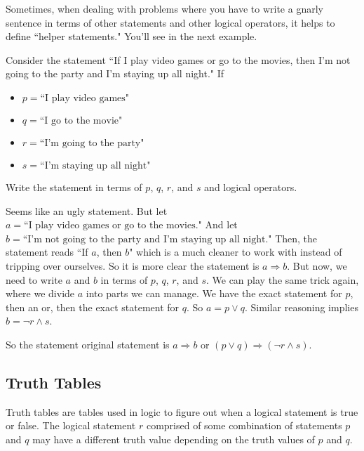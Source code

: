 \documentclass[11pt]{scrartcl}
\begin{document}
\begin{advice}
    Sometimes, when dealing with problems where you have to write a gnarly sentence in terms of other statements and other logical operators, it helps to define ``helper statements." You'll see in the next example.
\end{advice}

\begin{example}
    Consider the statement ``If I play video games or go to the movies, then I'm not going to the party and I'm  staying up all night." If
    \begin{itemize}
        \item $p = \text{``I play video games"}$
        \item $q = \text{``I go to the movie"}$
        \item $r = \text{``I'm going to the party"}$
        \item $s = \text{``I'm staying up all night"}$
    \end{itemize}
    Write the statement in terms of $p$, $q$, $r$, and $s$ and logical operators.
\end{example}
Seems like an ugly statement. But let $a = \text{``I play video games or go to the movies."}$ And let $b = \text{``I'm not going to the party and I'm  staying up all night."}$ Then, the statement reads ``If $a$, then $b$" which is a much cleaner to work with instead of tripping over ourselves. So it is more clear the statement is $a \Rightarrow b$. But now, we need to write $a$ and $b$ in terms of $p$, $q$, $r$, and $s$. We can play the same trick again, where we divide $a$ into parts we can manage. We have the exact statement for $p$, then an or, then the exact statement for $q$. So $a = p \vee q$. Similar reasoning implies $b = \neg r \wedge s$.

So the statement original statement is $a \Rightarrow b$ or $(p \vee q) \Rightarrow (\neg r \wedge s)$.

\subsection{Truth Tables}

Truth tables are tables used in logic to figure out when a logical statement is true or false. The logical statement $r$ comprised of some combination of statements $p$ and $q$ may have a different truth value depending on the truth values of $p$ and $q$.
\end{document}

